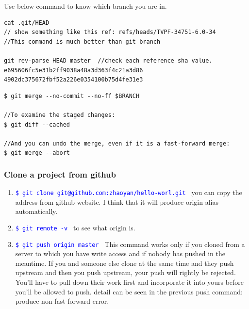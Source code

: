 \documentclass[paper=8.5in:11in, twoside, 12pt, pagesize=pdftex]{book}
\newcommand{\linuxcommand}[1]{\texttt{\textcolor{blue}{\$ #1 \Pisymbol{psy}{191}}}}
\begin{document}
	Use below command to know which branch you are in.
\begin{lstlisting}
cat .git/HEAD
// show something like this ref: refs/heads/TVPF-34751-6.0-34
//This command is much better than git branch

git rev-parse HEAD master  //check each reference sha value.  
e695606fc5e31b2ff9038a48a3d363f4c21a3d86
4902dc375672fbf52a226e0354100b75d4fe31e3
\end{lstlisting}


\begin{lstlisting}
$ git merge --no-commit --no-ff $BRANCH

//To examine the staged changes:
$ git diff --cached

//And you can undo the merge, even if it is a fast-forward merge:
$ git merge --abort
\end{lstlisting}

\subsubsection{Clone a project from github}
\begin{enumerate}
	\item  \linuxcommand{git clone git@github.com:zhaoyan/hello-worl.git}  you can copy the address from github website. I think that it will produce origin alias automatically.
	
	\item \linuxcommand{git remote -v } to see what origin is.
	
	\item \linuxcommand{git push origin master }   This command works only if you cloned from a server to which you have write access and if nobody has pushed in the meantime. If you and someone else clone at the same time and they push upstream and then you push upstream, your push will rightly be rejected. You'll have to pull down their work first and incorporate it into yours before you'll be allowed to push. detail can be seen in the previous push command: produce non-fast-forward error.
\end{enumerate}
\end{document}
